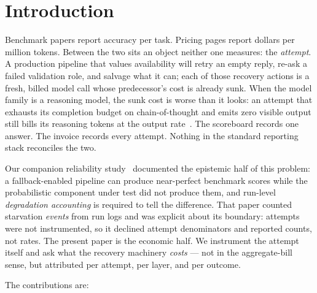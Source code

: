 \documentclass[11pt]{article}
\begin{document}
\section{Introduction}

Benchmark papers report accuracy per task. Pricing pages report dollars
per million tokens. Between the two sits an object neither one measures:
the \emph{attempt}. A production pipeline that values availability will
retry an empty reply, re-ask a failed validation role, and salvage what
it can; each of those recovery actions is a fresh, billed model call
whose predecessor's cost is already sunk. When the model family is a
reasoning model, the sunk cost is worse than it looks: an attempt that
exhausts its completion budget on chain-of-thought and emits zero
visible output still bills its reasoning tokens at the output
rate~\cite{openaireasoning,deepseekdocs}. The scoreboard records one
answer. The invoice records every attempt. Nothing in the standard
reporting stack reconciles the two.

Our companion reliability study~\cite{reliability} documented the
epistemic half of this problem: a fallback-enabled pipeline can produce
near-perfect benchmark scores while the probabilistic component under
test did not produce them, and run-level \emph{degradation accounting}
is required to tell the difference. That paper counted starvation
\emph{events} from run logs and was explicit about its boundary:
attempts were not instrumented, so it declined attempt denominators and
reported counts, not rates. The present paper is the economic half. We
instrument the attempt itself and ask what the recovery machinery
\emph{costs} --- not in the aggregate-bill sense, but attributed per
attempt, per layer, and per outcome.

The contributions are:
\end{document}
